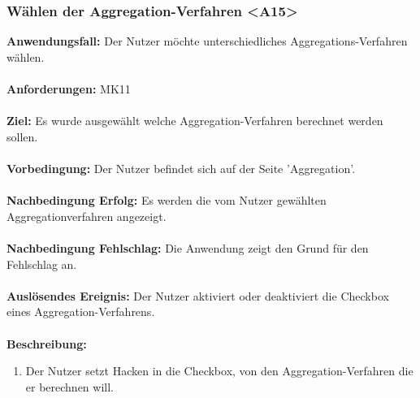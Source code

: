 \documentclass[parskip=full]{scrartcl} %
\begin{document}
\subsubsection*{Wählen der Aggregation-Verfahren <A15>}
\textbf{Anwendungsfall:} Der Nutzer möchte unterschiedliches Aggregations-Verfahren wählen.\\\\
\textbf{Anforderungen:} MK11\\\\
\textbf{Ziel:} Es wurde ausgewählt welche Aggregation-Verfahren berechnet werden sollen.\\\\
\textbf{Vorbedingung:} Der Nutzer befindet sich auf der Seite 'Aggregation'.\\\\
\textbf{Nachbedingung Erfolg:} Es werden die vom Nutzer gewählten Aggregationverfahren angezeigt.\\\\
\textbf{Nachbedingung Fehlschlag:} Die Anwendung zeigt den Grund für den Fehlschlag an. \\\\
\textbf{Auslösendes Ereignis:} Der Nutzer aktiviert oder deaktiviert die Checkbox eines Aggregation-Verfahrens. \\\\
\textbf{Beschreibung:}
\begin{enumerate}
    \item Der Nutzer setzt Hacken in die Checkbox, von den Aggregation-Verfahren die er berechnen will.
\end{enumerate}
\newpage
\end{document}
